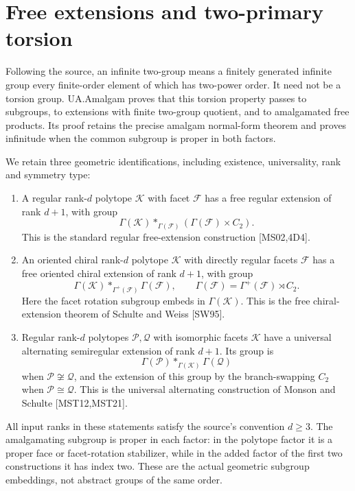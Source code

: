 \section{Free extensions and two-primary torsion}
Following the source, an infinite two-group means a finitely generated
infinite group every finite-order element of which has two-power order.
It need not be a torsion group. UA.Amalgam proves that this torsion property
passes to subgroups, to extensions with finite two-group quotient, and to
amalgamated free products. Its proof retains the precise amalgam normal-form
theorem and proves infinitude when the common subgroup is proper in both
factors.

We retain three geometric identifications, including existence, universality,
rank and symmetry type:
\begin{enumerate}
\item A regular rank-$d$ polytope $\mathcal K$ with facet $\mathcal F$ has
a free regular extension of rank $d+1$, with group
\[
 \Gamma(\mathcal K)*_{\Gamma(\mathcal F)}
       (\Gamma(\mathcal F)\times C_2).
\]
This is the standard regular free-extension construction [MS02,4D4].
\item An oriented chiral rank-$d$ polytope $\mathcal K$ with directly
regular facets $\mathcal F$ has a free oriented chiral extension of rank
$d+1$, with group
\[
 \Gamma(\mathcal K)*_{\Gamma^+(\mathcal F)}\Gamma(\mathcal F),
 \qquad \Gamma(\mathcal F)=\Gamma^+(\mathcal F)\rtimes C_2.
\]
Here the facet rotation subgroup embeds in $\Gamma(\mathcal K)$.
This is the free chiral-extension theorem of Schulte and Weiss [SW95].
\item Regular rank-$d$ polytopes $\mathcal P,\mathcal Q$ with isomorphic
facets $\mathcal K$ have a universal alternating semiregular extension of
rank $d+1$. Its group is
\[
 \Gamma(\mathcal P)*_{\Gamma(\mathcal K)}\Gamma(\mathcal Q)
\]
when $\mathcal P\not\cong\mathcal Q$, and the extension of this group by
the branch-swapping $C_2$ when $\mathcal P\cong\mathcal Q$. This is the
universal alternating construction of Monson and Schulte [MST12,MST21].
\end{enumerate}
All input ranks in these statements satisfy the source's convention $d\ge3$.
The amalgamating subgroup is proper in each factor: in the polytope factor
it is a proper face or facet-rotation stabilizer, while in the added factor
of the first two constructions it has index two. These are the actual
geometric subgroup embeddings, not abstract groups of the same order.

